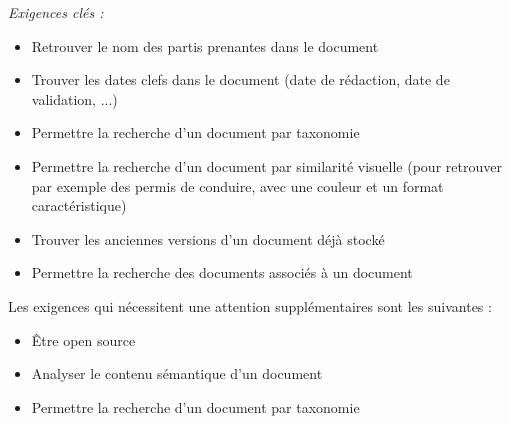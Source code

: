 \emph{Exigences clés :}
\begin {itemize}
\item Retrouver le nom des partis prenantes dans le document
\item Trouver les dates clefs dans le document (date de rédaction, date de validation, ...)
\item Permettre la recherche d'un document par taxonomie
\item Permettre la recherche d’un document par similarité visuelle (pour
retrouver par exemple des permis de conduire, avec une couleur et un
format caractéristique)
\item Trouver les anciennes versions d’un document déjà stocké
\item Permettre la recherche des documents associés à un document
\\
\end {itemize}


Les exigences qui nécessitent une attention supplémentaires sont les suivantes :
\begin {itemize}
\item Être open source
\item Analyser le contenu sémantique d'un document
\item Permettre la recherche d'un document par taxonomie
\end {itemize}




